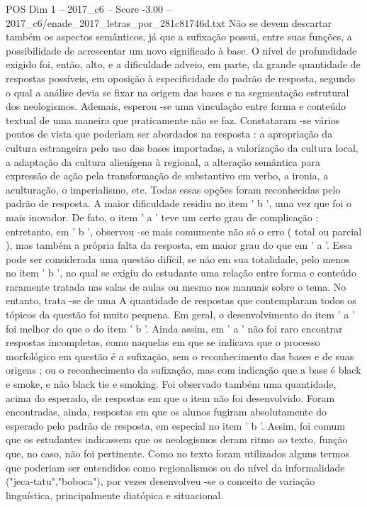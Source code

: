 \begin{textsample}{POS Dim 1 – 2017\_c6 – Score -3.00 – 2017\_c6/enade\_2017\_letras\_por\_281c81746d.txt}
Não se devem descartar também os aspectos semânticos, já que a sufixação possui, entre suas funções, a possibilidade de acrescentar um novo significado à base.
O nível de profundidade exigido foi, então, alto, e a dificuldade adveio, em parte, da grande quantidade de respostas possíveis, em oposição à especificidade do padrão de resposta, segundo o qual a análise devia se fixar na origem das bases e na segmentação estrutural dos neologismos.
Ademais, esperou -se uma vinculação entre forma e conteúdo textual de uma maneira que praticamente não se faz.
Constataram -se vários pontos de vista que poderiam ser abordados na resposta : a apropriação da cultura estrangeira pelo uso das bases importadas, a valorização da cultura local, a adaptação da cultura alienígena à regional, a alteração semântica para expressão de ação pela transformação de substantivo em verbo, a ironia, a aculturação, o imperialismo, etc.
Todas essas opções foram reconhecidas pelo padrão de resposta.
A maior dificuldade residiu no item ' b ', uma vez que foi o mais inovador.
De fato, o item ' a ' teve um certo grau de complicação ; entretanto, em ' b ', observou -se mais comumente não só o erro ( total ou parcial ), mas também a própria falta da resposta, em maior grau do que em ' a '.
Essa pode ser considerada uma questão difícil, se não em sua totalidade, pelo menos no item ' b ', no qual se exigiu do estudante uma relação entre forma e conteúdo raramente tratada nas salas de aulas ou mesmo nos manuais sobre o tema.
No entanto, trata -se de uma A quantidade de respostas que contemplaram todos os tópicos da questão foi muito pequena.
Em geral, o desenvolvimento do item ' a ' foi melhor do que o do item ' b '.
Ainda assim, em ' a ' não foi raro encontrar respostas incompletas, como naquelas em que se indicava que o processo morfológico em questão é a sufixação, sem o reconhecimento das bases e de suas origens ; ou o reconhecimento da sufixação, mas com indicação que a base é black e smoke, e não black tie e smoking.
Foi observado também uma quantidade, acima do esperado, de respostas em que o item não foi desenvolvido.
Foram encontradas, ainda, respostas em que os alunos fugiram absolutamente do esperado pelo padrão de resposta, em especial no item ' b '.
Assim, foi comum que os estudantes indicassem que os neologismos deram ritmo ao texto, função que, no caso, não foi pertinente.
Como no texto foram utilizados alguns termos que poderiam ser entendidos como regionalismos ou do nível da informalidade ("jeca-tatu","boboca"), por vezes desenvolveu -se o conceito de variação linguística, principalmente diatópica e situacional.

\end{textsample}
